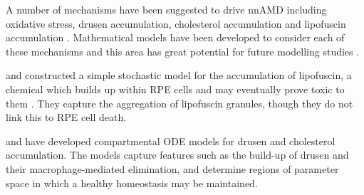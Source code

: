 \documentclass{article}
\begin{document}
A number of mechanisms have been suggested to drive nnAMD including oxidative stress, drusen accumulation, cholesterol accumulation and lipofuscin accumulation \citep{Ambati_and_Fowler_2012,Handa_et_al_2019}. Mathematical models have been developed to consider each of these mechanisms and this area has great potential for future modelling studies \citep{Handa_et_al_2019,Luthert_et_al_2018}.

\citet{Mazzitello_et_al_2009} and \citet{Family_et_al_2010} constructed a simple stochastic model for the accumulation of lipofuscin, a chemical which builds up within RPE cells and may eventually prove toxic to them \citep{Sparrow_and_Boulton_2005}. They capture the aggregation of  lipofuscin granules, though they do not link this to RPE cell death.

\citet{Zekavat_et_al_2017} and \citet{Scheepers_et_al_2020} have developed compartmental ODE models for drusen and cholesterol accumulation. The models capture features such as the build-up of drusen and their macrophage-mediated elimination, and determine regions of parameter space in which a healthy homeostasis may be maintained.
\end{document}
